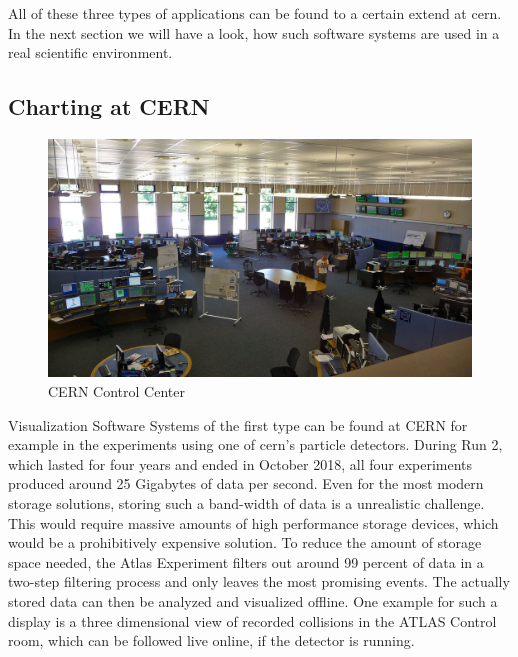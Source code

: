 All of these three types of applications can be found to a certain extend at
\gls{cern}. In the next section we will have a look, how such software systems
are used in a real scientific environment.



\subsection{Charting at CERN}
\label{sec:fundamentals:cerncharting}

\begin{figure}[h]
    \centering
    \includegraphics[width=14cm]{resources/img/CernControlCenter}
    \caption{CERN Control Center}
    \label{fig:ccc}
\end{figure}

Visualization Software Systems of the first type can be found at CERN for
example in the experiments using one of \gls{cern}'s particle detectors. During
Run 2, which lasted for four years and ended in October 2018, all four
experiments produced around 25 Gigabytes of data per second. Even for the most
modern storage solutions, storing such a band-width of data is a unrealistic
challenge. This would require massive amounts of high performance storage
devices, which would be a prohibitively expensive solution. To reduce the amount
of storage space needed, the Atlas Experiment filters out around 99 percent of
data in a two-step filtering process and only leaves the most promising events.
The actually stored data can then be analyzed and visualized offline. One
example for such a display is a three dimensional view of recorded collisions in
the ATLAS Control room, which can be followed live online, if the detector is
running.
\cite{LhcDataStorage, LhcRun2, AtlasLiveCollisions, AtlasTrigger}

